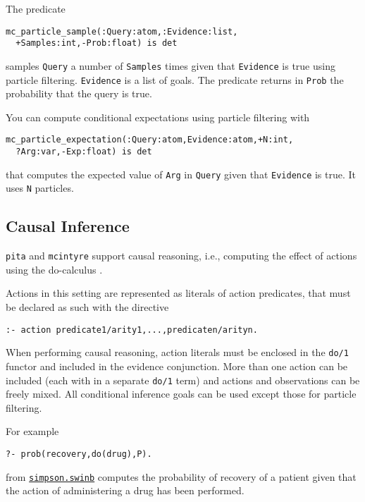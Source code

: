 The predicate
\begin{verbatim}
mc_particle_sample(:Query:atom,:Evidence:list,
  +Samples:int,-Prob:float) is det
\end{verbatim}
samples \verb|Query|  a number of \verb|Samples| times given that
\verb|Evidence|
is true using particle filtering. \verb|Evidence| is a list of goals.
The predicate returns in \verb|Prob| the probability that the query is true.

You can compute conditional expectations using particle filtering with
\begin{verbatim}
mc_particle_expectation(:Query:atom,Evidence:atom,+N:int,
  ?Arg:var,-Exp:float) is det
\end{verbatim}
that computes the expected value of \verb|Arg| in \verb|Query| given that
\verb|Evidence| is true.
It uses \verb|N| particles.

\subsection{Causal Inference}
\label{causal}

\verb|pita| and \verb|mcintyre| support causal reasoning, i.e., computing the effect of actions using the
do-calculus \cite{Pea00-book}.

Actions in this setting are represented as literals of action predicates, that must be declared as such
with the directive
\begin{verbatim}
:- action predicate1/arity1,...,predicaten/arityn.
\end{verbatim}
When performing causal reasoning, action literals must be enclosed in the \verb|do/1| functor and included in the evidence conjunction. More than one action can be included (each with in a separate
\verb|do/1| term) and actions and observations can be freely mixed.
All conditional inference goals can be used except those for particle filtering.

For example
\begin{verbatim}
?- prob(recovery,do(drug),P).
\end{verbatim}
from \href{http://cplint.eu/e/simpson.swinb}{\texttt{simpson.swinb}}
computes the probability of recovery of a patient given that the action of administering a drug has
been performed.
